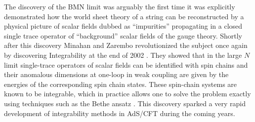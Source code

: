 The discovery of the BMN limit was arguably the first time it was explicitly demonstrated how the world sheet theory of a string can be reconstructed by a physical picture of scalar fields dubbed as ``impurities'' propagating in a closed single trace operator of ``background'' scalar fields of the gauge theory. 
Shortly after this discovery Minahan and Zarembo revolutionized the subject once again by discovering Integrability at the end of 2002 \cite{Minahan:2002ve}.
They showed that in the large $N$ limit single-trace operators of scalar fields can be identified with spin chains and their anomalous dimensions at one-loop in weak coupling are given by the energies of the corresponding spin chain states.
These spin-chain systems are known to be integrable, which in practice allows one to solve the problem exactly using techniques such as the Bethe ansatz \cite{Bethe:1931}. 
This discovery sparked a very rapid development of integrability methods in AdS/CFT during the coming years.

\vspace{20pt}
\vspace{20pt}


